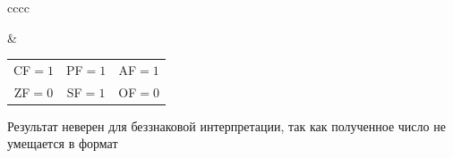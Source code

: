 \documentclass[12pt,a4paper]{report}
\begin{document}
\begin{tabular}{cccc}
 &
    \begin{tabular}{ccc}
    CF$=1$ & PF$=1$ & AF$=1$\\
    ZF$=0$ & SF$=1$ & OF$=0$
    \end{tabular}
\end{tabular}
\hfill\break
Результат неверен для беззнаковой интерпретации, так как полученное число не умещается в формат\\
\hfill\break
\end{document}
